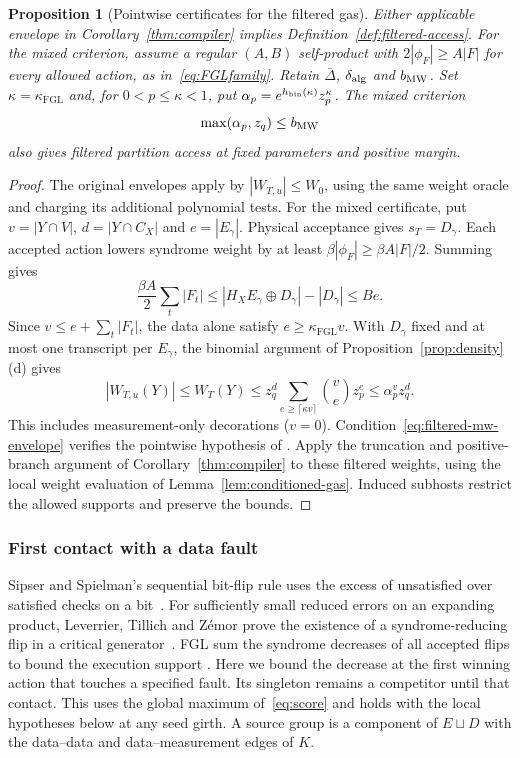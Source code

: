 \documentclass[10pt,twocolumn]{article}
\newtheorem{proposition}[theorem]{Proposition}
\theoremstyle{definition}
\newcommand{\kF}{\kappa_{\mathrm{FGL}}}
\begin{document}
\begin{proposition}[Pointwise certificates for the filtered gas]\label{prop:filtered-criteria}
Either applicable envelope in Corollary~\ref{thm:compiler} implies
Definition~\ref{def:filtered-access}. For the mixed criterion, assume a
regular $(A,B)$ self-product with $2|\phi_F|\ge A|F|$ for every allowed
action, as in~\eqref{eq:FGLfamily}. Retain $\bar\Delta$,
$\delta_{\rm alg}$ and $b_{\rm MW}$. Set $\kappa=\kF$ and, for
$0<p\le\kappa<1$, put $\alpha_p=e^{h_{\rm bin}(\kappa)}z_p^\kappa$.
The mixed criterion
\begin{equation}\label{eq:filtered-mw-envelope}
 \max(\alpha_p,z_q)\le b_{\rm MW}
\end{equation}
also gives filtered partition access at fixed parameters and positive margin.
\end{proposition}
\begin{proof}
The original envelopes apply by $|W_{T,u}|\le W_0$, using the same
weight oracle and charging its additional polynomial tests.
For the mixed certificate, put $v=|Y\cap V|$, $d=|Y\cap C_X|$
and $e=|E_\gamma|$. Physical acceptance gives $s_T=D_\gamma$.
Each accepted action lowers syndrome weight by at least
$\beta|\phi_F|\ge\beta A|F|/2$. Summing gives
\[
 \frac{\beta A}{2}\sum_t|F_t|
 \le |H_XE_\gamma\oplus D_\gamma|-|D_\gamma|\le B e.
\]
Since $v\le e+\sum_t|F_t|$, the data alone satisfy $e\ge\kF v$.
With $D_\gamma$ fixed and at most one transcript per
$E_\gamma$, the binomial argument of Proposition~\ref{prop:density}(d)
gives
\[
 |W_{T,u}(Y)|\le W_T(Y)
 \le z_q^d\sum_{e\ge\lceil\kappa v\rceil}\binom ve z_p^e
 \le\alpha_p^v z_q^d.
\]
This includes measurement-only decorations ($v=0$).
Condition~\eqref{eq:filtered-mw-envelope} verifies
the pointwise hypothesis of \cite[Thm.~1]{MW25}. Apply the truncation
and positive-branch argument of Corollary~\ref{thm:compiler} to these
filtered weights, using the local weight evaluation of
Lemma~\ref{lem:conditioned-gas}.
Induced subhosts restrict the allowed supports and preserve the bounds.
\end{proof}

\subsubsection{First contact with a data fault}
Sipser and Spielman's sequential bit-flip rule uses the excess of
unsatisfied over satisfied checks on a bit~\cite[Sec.~V.A]{SS96}.
For sufficiently small reduced errors on an expanding product,
Leverrier, Tillich and Z\'emor prove the existence of a syndrome-reducing
flip in a critical generator~\cite[Lemmas~7--8]{LTZ15}. FGL sum the syndrome
decreases of all accepted flips to bound the execution support
\cite[Prop.~22]{FGL18}. Here we bound the decrease at the first winning
action that touches a specified fault. Its singleton remains a competitor
until that contact. This uses the global maximum of~\eqref{eq:score}
and holds with the local hypotheses below at any seed girth.
A source group is a component of $E\sqcup D$ with the data--data
and data--measurement edges of $K$.
\end{document}
